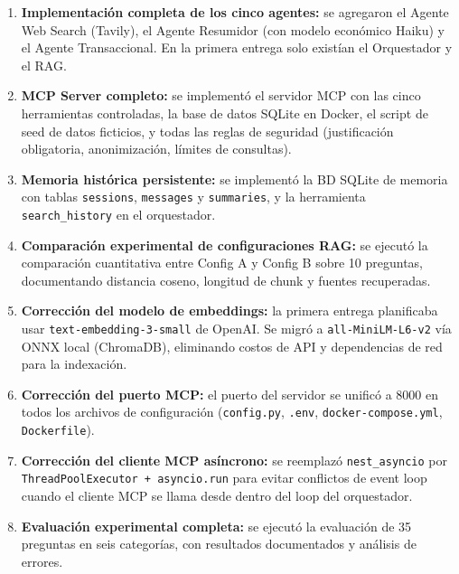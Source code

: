 \documentclass[conference]{IEEEtran}
\begin{document}
\begin{enumerate}
  \item \textbf{Implementación completa de los cinco agentes:} se agregaron el Agente Web Search (Tavily), el Agente Resumidor (con modelo económico Haiku) y el Agente Transaccional. En la primera entrega solo existían el Orquestador y el RAG.

  \item \textbf{MCP Server completo:} se implementó el servidor MCP con las cinco herramientas controladas, la base de datos SQLite en Docker, el script de seed de datos ficticios, y todas las reglas de seguridad (justificación obligatoria, anonimización, límites de consultas).

  \item \textbf{Memoria histórica persistente:} se implementó la BD SQLite de memoria con tablas \texttt{sessions}, \texttt{messages} y \texttt{summaries}, y la herramienta \texttt{search\_history} en el orquestador.

  \item \textbf{Comparación experimental de configuraciones RAG:} se ejecutó la comparación cuantitativa entre Config A y Config B sobre 10 preguntas, documentando distancia coseno, longitud de chunk y fuentes recuperadas.

  \item \textbf{Corrección del modelo de embeddings:} la primera entrega planificaba usar \texttt{text-embedding-3-small} de OpenAI. Se migró a \texttt{all-MiniLM-L6-v2} vía ONNX local (ChromaDB), eliminando costos de API y dependencias de red para la indexación.

  \item \textbf{Corrección del puerto MCP:} el puerto del servidor se unificó a 8000 en todos los archivos de configuración (\texttt{config.py}, \texttt{.env}, \texttt{docker-compose.yml}, \texttt{Dockerfile}).

  \item \textbf{Corrección del cliente MCP asíncrono:} se reemplazó \texttt{nest\_asyncio} por \texttt{ThreadPoolExecutor + asyncio.run} para evitar conflictos de event loop cuando el cliente MCP se llama desde dentro del loop del orquestador.

  \item \textbf{Evaluación experimental completa:} se ejecutó la evaluación de 35 preguntas en seis categorías, con resultados documentados y análisis de errores.
\end{enumerate}
\end{document}
